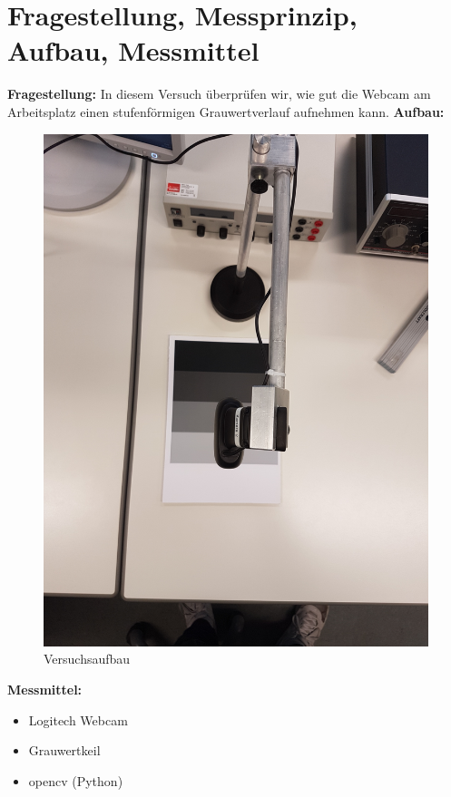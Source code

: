\documentclass[12pt, oneside, a4paper, \docLanguage]{report}
\begin{document}
\section{Fragestellung, Messprinzip, Aufbau, Messmittel}
\label{chap:VERSUCH_1_FRAGESTELLUNG}
\begin{normalsize}
\textbf{Fragestellung:}\newline
In diesem Versuch überprüfen wir, wie gut die Webcam am Arbeitsplatz einen stufenförmigen
Grauwertverlauf aufnehmen kann.\newline
\textbf{Aufbau:}\newline
\end{normalsize}
\begin{figure}[H]
\centering
\includegraphics[scale=0.08]{Versuchsaufbau2.jpg}
\caption{Versuchsaufbau}
\end{figure}
\pagebreak
\textbf{Messmittel:}
\begin{itemize}
\item Logitech Webcam
\item Grauwertkeil
\item opencv (Python)
\end{itemize}
\end{document}
